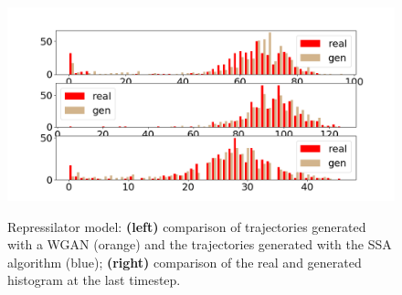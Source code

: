 \documentclass{article}
\begin{document}
\begin{figure}[ht]
{    \includegraphics[scale = 0.18]{new_img/Repr_hist_comparison_last_timestep_point_2.png}
    }
    \caption{Repressilator model: \textbf{(left)} comparison of trajectories generated with a WGAN (orange) and the trajectories generated with the SSA algorithm (blue); \textbf{(right)} comparison of the real and generated histogram at the last timestep.}
    \label{fig:repr_trajectories}
\end{figure}
\end{document}
